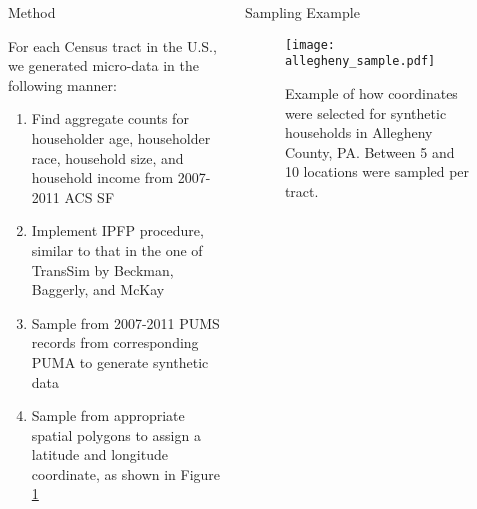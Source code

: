 \documentclass[final]{beamer}
\newlength{\onecolwid}
\newlength{\twocolwid}
\begin{document}
\begin{frame}[t]
\begin{columns}[t]
\begin{column}{\twocolwid}
\begin{columns}[t,totalwidth=\twocolwid] %

\begin{column}{\onecolwid} %


\begin{block}{Method}

For each Census tract in the U.S., we generated micro-data in the following manner:
  
\begin{enumerate}
\item Find aggregate counts for householder age, householder race, household size, and household income from 2007-2011 ACS SF
\item Implement IPFP procedure, similar to that in the one of TransSim by Beckman, Baggerly, and McKay \cite{beckman.baggerly.mckay96}
\item Sample from 2007-2011  PUMS records from corresponding PUMA to generate synthetic data
\item Sample from appropriate spatial polygons to assign a latitude and longitude coordinate, as shown in Figure \ref{alleghenysampling}

\end{enumerate}

\end{block}


\end{column} %

\begin{column}{\onecolwid} %


\begin{block}{Sampling Example}

\begin{figure}\label{alleghenysampling}
\texttt{[image: allegheny\_sample.pdf]}
\caption{Example of how coordinates were selected for synthetic households in Allegheny County, PA.  Between 5 and 10 locations were sampled per tract.}
\end{figure}



\end{block}
\end{column}
\end{columns}
\end{column}
\end{columns}
\end{frame}
\end{document}

